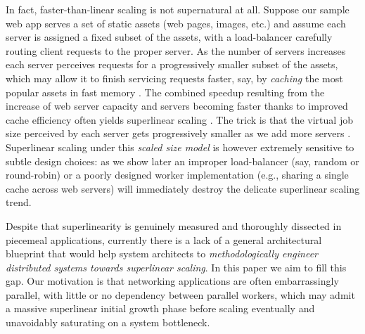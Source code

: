 In fact, faster-than-linear scaling is not supernatural at all. Suppose our sample web app serves a set of static assets (web pages, images, etc.) and assume each server is assigned a fixed subset of the assets, with a load-balancer carefully routing client requests to the proper server. As the number of servers increases each server perceives requests for a progressively smaller subset of the assets, which may allow it to finish servicing requests faster, say, by \emph{caching} the most popular assets in fast memory \cite{10.5555/1012889.1012894, 271208}. The combined speedup resulting from the increase of web server capacity and servers becoming faster thanks to improved cache efficiency often yields superlinear scaling \cite{556383, dobb-1, dobb-2, 7733347, 80148, wikipedia}. The trick is that the virtual job size perceived by each server gets progressively smaller as we add more servers \cite{10.1145/42411.42415, 556383, scalability-analyzed, icsoft20}. Superlinear scaling under this \emph{scaled size model} is however extremely sensitive to subtle design choices: as we show later an improper load-balancer (say, random or round-robin) or a poorly designed worker implementation (e.g., sharing a single cache across web servers) will immediately destroy the delicate superlinear scaling trend.

Despite that superlinearity is genuinely measured \cite{scalability-analyzed, sdn-analytitcs, 6483679, 10.1007/978-3-319-77610-1, 10.1145/3627703.3629574, icsoft20} and thoroughly dissected \cite{dobb-1, dobb-2, 10.1145/2773212.2789974, 556383, 7733347, 80148} in piecemeal applications, currently there is a lack of a general architectural blueprint that would help system architects to \emph{methodologically engineer distributed systems towards superlinear scaling}. In this paper we aim to fill this gap. Our motivation is that networking applications are often embarrassingly parallel, with little or no dependency between parallel workers, which may admit a massive superlinear initial growth phase before scaling eventually and unavoidably saturating on a system bottleneck.

